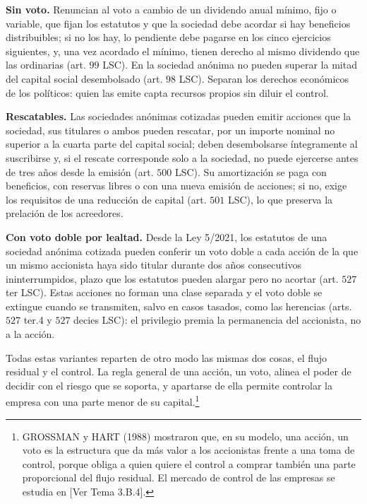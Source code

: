 \documentclass[10pt,a4paper]{article}
\newcommand{\authorfont}[1]{{\fontfamily{EBGaramond-TLF}\selectfont #1}}
\begin{document}
\textbf{Sin voto.} Renuncian al voto a cambio de un dividendo anual mínimo, fijo o variable, que fijan los estatutos y que la sociedad debe acordar si hay beneficios distribuibles; si no los hay, lo pendiente debe pagarse en los cinco ejercicios siguientes, y, una vez acordado el mínimo, tienen derecho al mismo dividendo que las ordinarias (art. $99$ LSC). En la sociedad anónima no pueden superar la mitad del capital social desembolsado (art. $98$ LSC). Separan los derechos económicos de los políticos: quien las emite capta recursos propios sin diluir el control.

\textbf{Rescatables.} Las sociedades anónimas cotizadas pueden emitir acciones que la sociedad, sus titulares o ambos pueden rescatar, por un importe nominal no superior a la cuarta parte del capital social; deben desembolsarse íntegramente al suscribirse y, si el rescate corresponde solo a la sociedad, no puede ejercerse antes de tres años desde la emisión (art. $500$ LSC). Su amortización se paga con beneficios, con reservas libres o con una nueva emisión de acciones; si no, exige los requisitos de una reducción de capital (art. $501$ LSC), lo que preserva la prelación de los acreedores.

\textbf{Con voto doble por lealtad.} Desde la Ley 5/2021, los estatutos de una sociedad anónima cotizada pueden conferir un voto doble a cada acción de la que un mismo accionista haya sido titular durante dos años consecutivos ininterrumpidos, plazo que los estatutos pueden alargar pero no acortar (art. $527$ ter LSC). Estas acciones no forman una clase separada y el voto doble se extingue cuando se transmiten, salvo en casos tasados, como las herencias (arts. $527$ ter.4 y $527$ decies LSC): el privilegio premia la permanencia del accionista, no a la acción.

Todas estas variantes reparten de otro modo las mismas dos cosas, el flujo residual y el control. La regla general de una acción, un voto, alinea el poder de decidir con el riesgo que se soporta, y apartarse de ella permite controlar la empresa con una parte menor de su capital.\footnote{%
    GROSSMAN y HART (1988) mostraron que, en su modelo, una acción, un voto es la estructura que da más valor a los accionistas frente a una toma de control, porque obliga a quien quiere el control a comprar también una parte proporcional del flujo residual. El mercado de control de las empresas se estudia en [\authorfont{Ver Tema 3.B.4}].
}
\end{document}
